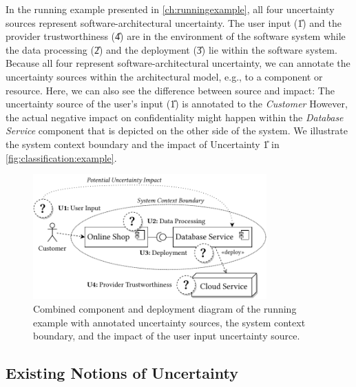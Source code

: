 
In the running example presented in \autoref{ch:runningexample}, all four uncertainty sources represent software-architectural uncertainty.
The user input (\U{1}) and the provider trustworthiness (\U{4}) are in the environment of the software system while the data processing (\U{2}) and the deployment (\U{3}) lie within the software system.
Because all four represent software-architectural uncertainty, we can annotate the uncertainty sources within the architectural model, e.g., to a component or resource.
Here, we can also see the difference between source and impact: The uncertainty source of the user's input (\U{1}) is annotated to the \emph{Customer}
However, the actual negative impact on confidentiality might happen within the \emph{Database Service} component that is depicted on the other side of the system.
We illustrate the system context boundary and the impact of Uncertainty \U{1} in \autoref{fig:classification:example}.

\begin{figure}
    \centering
    \includegraphics[width=0.8\textwidth]{figures/chapter5/onlineshop-context.pdf}
    \caption{Combined component and deployment diagram of the running example with annotated uncertainty sources, the system context boundary, and the impact of the user input uncertainty source.}
    \label{fig:classification:example}
\end{figure}


\subsection{Existing Notions of Uncertainty}

